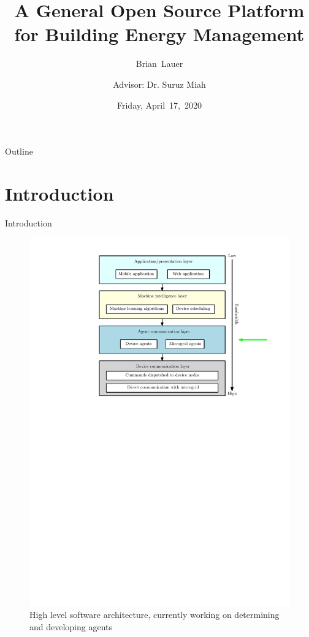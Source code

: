 \documentclass{beamer}
\title[Progress Update]{A General Open Source Platform for Building Energy Management}
\author[B.~Lauer]{Brian~Lauer\\\and
Advisor: Dr. Suruz Miah}
\institute[Bradley University] %
{
  Department of Electrical and Computer Engineering\\
  Bradley University\\
  1501 W. Bradley Avenue\\
  Peoria, IL, 61625, USA
}
\date[Friday~17,~2020]{Friday, April~17,~2020}
\begin{document}
\begin{frame}
  \titlepage
\end{frame}

\begin{frame}{Outline}
  \tableofcontents
\end{frame}


\section{Introduction}
\begin{frame}{Introduction}
\begin{figure}
\includegraphics[scale=0.43]{../figs/ipe/BEMS-softwareArchitectureAgents}
\caption{High level software architecture, currently working on determining and developing agents}
\end{figure}
\end{frame}
\end{document}
